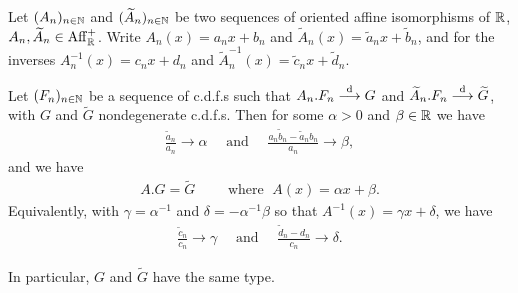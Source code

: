 \begin{corollary}
  \label{cor:convergence-to-types-different-limit}
  Let $(A_n)_{n \in \mathbb{N}}$ and
  $(\widetilde{A}_n)_{n \in \mathbb{N}}$ be two sequences of oriented
  affine isomorphisms of $\mathbb{R}$, $A_n, \widetilde{A}_n \in \mathrm{Aff}^+_{\mathbb{R}}$.
  Write $A_n(x) = a_n x + b_n$
  and $\widetilde{A}_n(x) = \tilde{a}_n x + \tilde{b}_n$,
  and for the inverses $A_n^{-1}(x) = c_n x + d_n$
  and $\widetilde{A}^{-1}_n(x) = \tilde{c}_n x + \tilde{d}_n$.

  Let $(F_n)_{n \in \mathbb{N}}$ be a sequence of c.d.f.s
  such that $A_n.F_n \overset{\mathrm{d}}{\longrightarrow} G$ and
  $\widetilde{A}_n.F_n \overset{\mathrm{d}}{\longrightarrow} \widetilde{G}$, with
  $G$ and $\widetilde{G}$ nondegenerate c.d.f.s.
  Then for some $\alpha>0$ and $\beta \in \mathbb{R}$ we have
  \begin{align*}
    \frac{\tilde{a}_n}{a_n} \to \alpha
    \quad \text{ and } \quad
    \frac{a_n \tilde{b}_n - \tilde{a}_n b_n}{a_n} \to \beta,
  \end{align*}
  and we have
  \begin{align*}
    A.G = \widetilde{G}
    \qquad \text{ where } \; A(x) = \alpha x + \beta .
  \end{align*}
  Equivalently, with $\gamma = \alpha^{-1}$ and $\delta = -\alpha^{-1} \beta$
  so that $A^{-1}(x) = \gamma x + \delta$, we have
  \begin{align*}
    \frac{\tilde{c}_n}{c_n} \to \gamma
    \quad \text{ and } \quad
    \frac{\tilde{d}_n - d_n}{c_n} \to \delta .
  \end{align*}

  In particular, $G$ and $\widetilde{G}$ have the same type.
\end{corollary}
